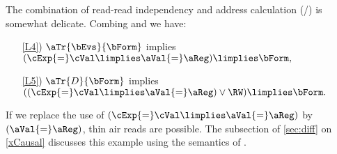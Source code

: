 \begin{example}
  \label{ex:xADDRxRRD}
  The combination of read-read independency and address calculation
  (\xADDR/\xRRD) is somewhat delicate.  Combing  and
   we have:
  \begin{enumerate}
    
  \item[\ref{L4})]
    $\aTr{\bEvs}{\bForm}$ implies
    \begin{math}
      (\cExp{=}\cVal\limplies\aVal{=}\aReg)\limplies\bForm,
    \end{math}
  \item[\ref{L5})]
    $\aTr{\cEvs}{\bForm}$ implies
    \begin{math}
      ((\cExp{=}\cVal\limplies\aVal{=}\aReg)\lor\RW)\limplies\bForm.
    \end{math}
  \end{enumerate}
  If we replace the use of $(\cExp{=}\cVal\limplies\aVal{=}\aReg)$ by
  $(\aVal{=}\aReg)$, thin air reads are possible.  The subsection of
  \textsection\ref{sec:diff} on \ref{xCausal} discusses this example using
  the semantics of \jjr{}.
  

\end{example}

